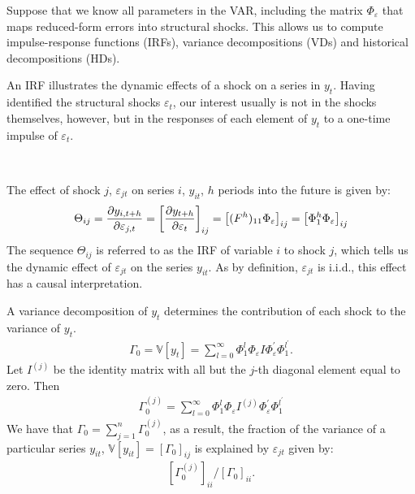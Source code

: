 Suppose that we know all parameters in the VAR, including the matrix $\Phi_{\varepsilon}$ that maps reduced-form errors into structural shocks.
This allows us to compute impulse-response functions (IRFs), variance decompositions (VDs) and historical decompositions (HDs).

An IRF illustrates the dynamic effects of a shock on a series in $y_t$.
Having identified the structural shocks $\varepsilon_t$, our interest usually is not in the shocks themselves,
however, but in the responses of each element of $y_t$ to a one-time impulse of $\varepsilon_t$.
\begin{definition}\label{def:IRF}
    \

    The effect of shock $j$, $\varepsilon_{jt}$ on series $i$, $y_{it}$, $h$ periods into the future is given by:
    \begin{gather}\label{eq:IRF}
        \Theta_{ij} = \frac{\partial y_{i, t+h}}{\partial \varepsilon_{j, t}} = \left[ \frac{\partial y_{t+h}}{\partial \varepsilon_t} \right]_{ij} = \left[(F^h)_{11} \Phi_{\varepsilon}\right]_{ij} = \left[\Phi_1^h \Phi_{\varepsilon}\right]_{ij}
    \end{gather}
    The sequence $\Theta_{ij}$ is referred to as the IRF of variable $i$ to shock $j$,
    which tells us the dynamic effect of $\varepsilon_{jt}$ on the series $y_{it}.$
    As by definition, $\varepsilon_{jt}$ is i.i.d., this effect has a causal interpretation.
\end{definition}

A variance decomposition of $y_t$ determines the contribution of each shock to the variance of $y_t$.
\begin{gather*}
    \Gamma_0 = \mathbb{V}[y_t] = \sum_{l=0}^{\infty} \Phi_1^l \Phi_\varepsilon I \Phi_\varepsilon^{\prime} \Phi_1^{l^\prime}.
\end{gather*}
Let $I^{(j)}$ be the identity matrix with all but the $j$-th diagonal element equal to zero. Then
\begin{gather*}
    \Gamma_0^{(j)} = \sum_{l=0}^{\infty} \Phi_1^l \Phi_\varepsilon I^{(j)} \Phi_\varepsilon^{\prime} \Phi_1^{l^\prime}
\end{gather*}
We have that $\Gamma_0 = \sum_{j=1}^{n} \Gamma_0^{(j)}$, as a result,
the fraction of the variance of a particular series $y_{it}$, $\mathbb{V}[y_{it}] = \left[\Gamma_0\right]_{ij}$ is explained by $\varepsilon_{jt}$ given by:
\begin{gather*}
    \left[\Gamma_0^{(j)}\right]_{ii} / \left[\Gamma_0\right]_{ii}.
\end{gather*}

